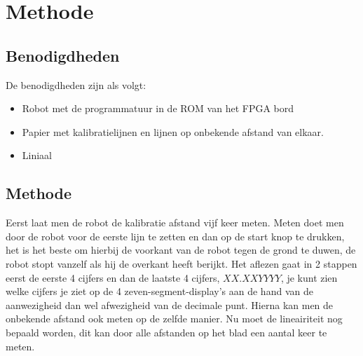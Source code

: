 \documentclass[a4paper]{article}
\begin{document}
\section{Methode}
\subsection{Benodigdheden}
De benodigdheden zijn als volgt:
\begin{itemize}
\item Robot met de programmatuur in de ROM van het FPGA bord
\item Papier met kalibratielijnen en lijnen op onbekende afstand van elkaar.
\item Liniaal
\end{itemize}
\subsection{Methode}
Eerst laat men de robot de kalibratie afstand vijf keer meten. Meten doet men door de robot voor de eerste lijn te zetten en dan op de start knop te drukken, het is het beste om hierbij de voorkant van de robot tegen de grond te duwen, de robot stopt vanzelf als hij de overkant heeft berijkt. Het aflezen gaat in 2 stappen eerst de eerste 4 cijfers en dan de laatste 4 cijfers, $XX.XXYYYY$, je kunt zien welke cijfers je ziet op de 4 zeven-segment-display's aan de hand van de aanwezigheid dan wel afwezigheid van de decimale punt.
Hierna kan men de onbekende afstand ook meten op de zelfde manier.
Nu moet de lineairiteit nog bepaald worden, dit kan door alle afstanden op het blad een aantal keer te meten.
\end{document}
